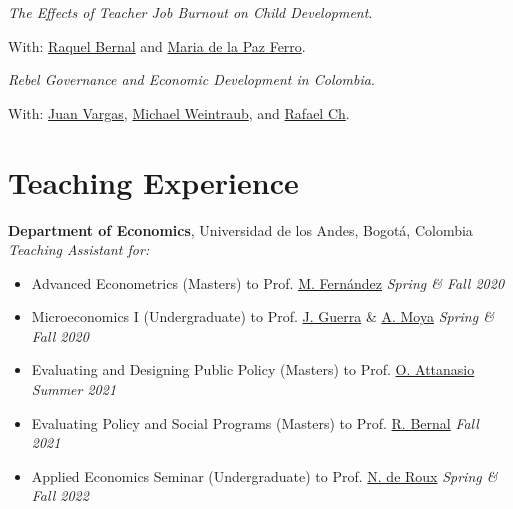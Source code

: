 \documentclass[margin,line]{res}
\newenvironment{list1}{
  \begin{list}{\ding{113}}{%
      \setlength{\itemsep}{0in}
      \setlength{\parsep}{0in} \setlength{\parskip}{0in}
      \setlength{\topsep}{0in} \setlength{\partopsep}{0in} 
      \setlength{\leftmargin}{0.17in}}}{\end{list}}
\begin{document}
\begin{resume}
\textit{The Effects of Teacher Job Burnout on Child Development}.
\begin{list1}
    \item[] With: \href{https://sites.google.com/view/raquelbernal}{Raquel Bernal} and \href{https://economics.ucsd.edu/graduate-program/about/grad-profiles/cohort%202021/Ferro-maria.html}{Maria de la Paz Ferro}.  
\end{list1}

\textit{Rebel Governance and Economic Development in Colombia}.
\begin{list1}
    \item[] With: \href{https://sites.google.com/site/juanfvargas/}{Juan Vargas},  \href{http://www.miweintraub.com/}{Michael Weintraub}, and  \href{https://wp.nyu.edu/rafaelch/}{Rafael Ch}.  
\end{list1}

\section{\sc Teaching Experience}

{\bf Department of Economics}, Universidad de los Andes, Bogotá, Colombia \\
{\em Teaching Assistant for:} \\
\vspace{-.3cm}
\begin{itemize}
    \item Advanced Econometrics (Masters) to Prof. \href{https://sites.google.com/view/manuelfernandezsierra}{M. Fernández} \hfill \emph{Spring  \& Fall 2020}
    \item Microeconomics I (Undergraduate) to Prof. \href{https://jguerraforero.wixsite.com/joseaguerra}{J. Guerra} \& \href{https://sites.google.com/view/andresmoya}{A. Moya} \hfill \emph{Spring \& Fall 2020}
    \item Evaluating and Designing Public Policy (Masters) to Prof. \href{http://www.orazioattanasio.org/}{O. Attanasio}  \hfill \emph{Summer 2021}
    \item Evaluating Policy and Social Programs (Masters) to Prof. \href{https://sites.google.com/view/raquelbernal}{R. Bernal}  \hfill \emph{Fall 2021}
    \item Applied Economics Seminar (Undergraduate) to Prof. \href{https://sites.google.com/site/nicoderoux/}{N. de Roux}  \hfill \emph{Spring \& Fall 2022}
\end{itemize}

\vspace{-.2cm}


\end{resume}
\end{document}
